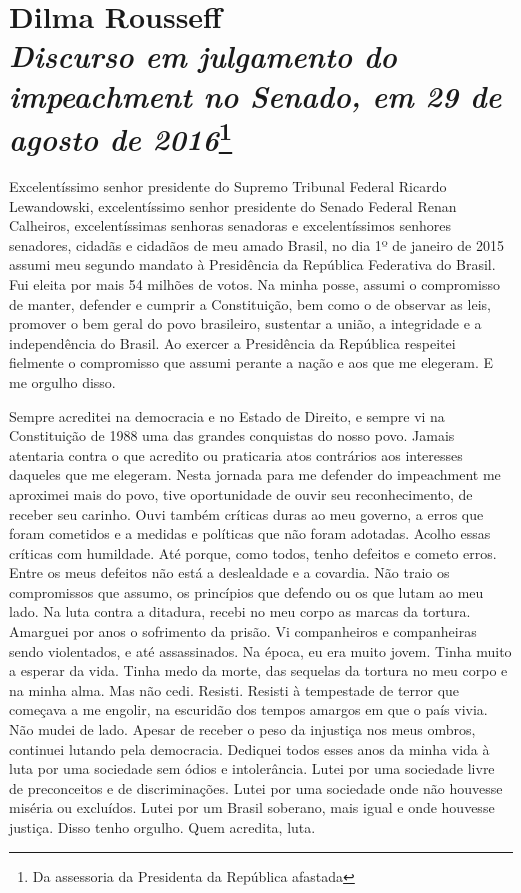 \chapter*{Dilma Rousseff\\
\emph{\large{Discurso em julgamento do impeachment no Senado, em 29
de agosto de 2016}}\footnote{Da assessoria da Presidenta da República afastada}}


Excelentíssimo senhor presidente do Supremo Tribunal Federal Ricardo
Lewandowski, excelentíssimo senhor presidente do Senado Federal Renan
Calheiros, excelentíssimas senhoras senadoras e excelentíssimos senhores
senadores, cidadãs e cidadãos de meu amado Brasil, no dia 1º de janeiro
de 2015 assumi meu segundo mandato à Presidência da República Federativa
do Brasil. Fui eleita por mais 54 milhões de votos. Na minha posse,
assumi o compromisso de manter, defender e cumprir a Constituição, bem
como o de observar as leis, promover o bem geral do povo brasileiro,
sustentar a união, a integridade e a independência do Brasil. Ao exercer
a Presidência da República respeitei fielmente o compromisso que assumi
perante a nação e aos que me elegeram. E me orgulho disso.

Sempre
acreditei na democracia e no Estado de Direito, e sempre vi na
Constituição de 1988 uma das grandes conquistas do nosso povo. Jamais
atentaria contra o que acredito ou praticaria atos contrários aos
interesses daqueles que me elegeram. Nesta jornada para me defender do
impeachment me aproximei mais do povo, tive oportunidade de ouvir
seu reconhecimento, de receber seu carinho. Ouvi também críticas duras
ao meu governo, a erros que foram cometidos e a medidas e políticas que
não foram adotadas. Acolho essas críticas com humildade. Até porque,
como todos, tenho defeitos e cometo erros. Entre os meus defeitos não
está a deslealdade e a covardia. Não traio os compromissos que assumo,
os princípios que defendo ou os que lutam ao meu lado. Na luta contra a
ditadura, recebi no meu corpo as marcas da tortura. Amarguei por anos o
sofrimento da prisão. Vi companheiros e companheiras sendo violentados,
e até assassinados. Na época, eu era muito jovem. Tinha muito a esperar
da vida. Tinha medo da morte, das sequelas da tortura no meu corpo e na
minha alma. Mas não cedi. Resisti. Resisti à tempestade de terror que
começava a me engolir, na escuridão dos tempos amargos em que o país
vivia. Não mudei de lado. Apesar de receber o peso da injustiça nos meus
ombros, continuei lutando pela democracia. Dediquei todos esses anos da
minha vida à luta por uma sociedade sem ódios e intolerância. Lutei por
uma sociedade livre de preconceitos e de discriminações. Lutei por uma
sociedade onde não houvesse miséria ou excluídos. Lutei por um Brasil
soberano, mais igual e onde houvesse justiça. Disso tenho orgulho. Quem
acredita, luta.

